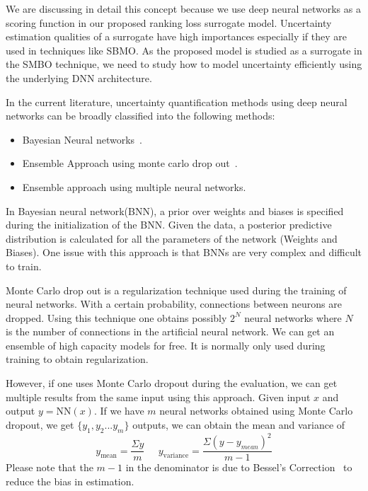 \documentclass[12pt, twoside, ngerman]{report}
\begin{document}
We are discussing in detail this concept because we use deep neural networks as a scoring function in our proposed ranking loss surrogate model.
Uncertainty estimation qualities of a surrogate have high importances especially if they are used in techniques like SBMO.
As the proposed model is studied as a surrogate in the SMBO technique,  we need to study how to model uncertainty efficiently using the underlying DNN architecture.

In the current literature,  uncertainty quantification methods using deep neural networks can be broadly classified into the following methods:
\begin{itemize}
\item Bayesian Neural networks~\cite{Goan-2020}.
\item Ensemble Approach using monte carlo drop out~\cite{JMLR:v15:srivastava14a}.
\item Ensemble approach using multiple neural networks.
\end{itemize}

In Bayesian neural network(BNN),  a prior over weights and biases is specified during the initialization of the BNN.
Given the data,  a posterior predictive distribution is calculated for all the parameters of the network (Weights and Biases).
One issue with this approach is that BNNs are very complex and difficult to train. 

Monte Carlo drop out is a regularization technique used during the training of neural networks.
With a certain probability,  connections between neurons are dropped.
Using this technique one obtains possibly $2^N$ neural networks where $N$ is the number of connections
in the artificial neural network.
We can get an ensemble of high capacity models for free.
It is normally only used during training to obtain regularization.

However,  if one uses Monte Carlo dropout during the evaluation,  we can get multiple results from the same input using this approach.
Given input $x$ and output $y = \textrm{NN}(x)$.  If we have $m$ neural networks obtained using Monte Carlo dropout,  we get $\{y_1, y_2... y_m\}$ outputs,  we can obtain the mean and variance of 
\begin{equation}\label{eq:simpleDNNensemble}
y_\textrm{mean} = \frac{\Sigma y}{m}  \;\;\;\;\;  y_\textrm{variance} =\frac{\Sigma(y - y_{mean})^2}{m-1}
\end{equation}
Please note that the $m-1$ in the denominator is due to Bessel’s Correction~\cite{besselcorrection} to reduce the bias in estimation.
\end{document}
